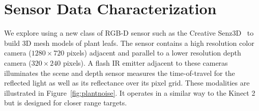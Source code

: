 \section{Sensor Data Characterization}
\label{sec:data}


We explore using a new class of RGB-D sensor such as the Creative Senz3D~\cite{nguyen2015vietnamese} to build 3D mesh models of plant leafs. The sensor contains a high resolution color camera ($1280 \times 720$ pixels) adjacent and parallel to a lower resolution depth camera ($320\times240$ pixels).  A flash IR emitter adjacent to these cameras illuminates the scene and depth sensor measures the time-of-travel for the reflected light as well as its reflectance over its pixel grid.  These modalities are illustrated in Figure~\ref{fig:plantnoise}.  It operates in a similar way to the Kinect 2 but is designed for closer range targets.  

